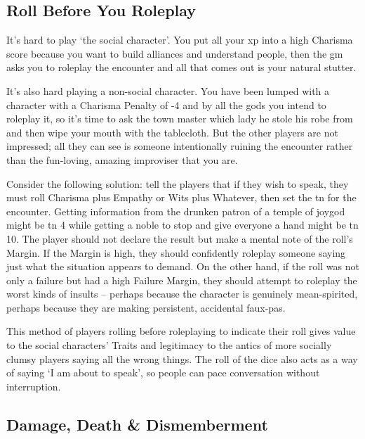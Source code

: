 \begin{multicols}{2}

\subsection{Roll Before You Roleplay}

It's hard to play `the social character'.
You put all your \gls{xp} into a high Charisma score because you want to build alliances and understand people, then the \gls{gm} asks you to roleplay the encounter and all that comes out is your natural stutter.

It's also hard playing a non-social character.
You have been lumped with a character with a Charisma Penalty of -4 and by all the gods you intend to roleplay it, so it's time to ask the town master which lady he stole his robe from and then wipe your mouth with the tablecloth.
But the other players are not impressed; all they can see is someone intentionally ruining the encounter rather than the fun-loving, amazing improviser that you are.

Consider the following solution: tell the players that if they wish to speak, they must roll Charisma plus Empathy or Wits plus Whatever, then set the \gls{tn} for the encounter.
Getting information from the drunken patron of a temple of \gls{joygod} might be \gls{tn} 4 while getting a noble to stop and give everyone a hand might be \gls{tn} 10.
The player should not declare the result but make a mental note of the roll's Margin.
If the Margin is high, they should confidently roleplay someone saying just what the situation appears to demand.
On the other hand, if the roll was not only a failure but had a high Failure Margin, they should attempt to roleplay the worst kinds of insults -- perhaps because the character is genuinely mean-spirited, perhaps because they are making persistent, accidental faux-pas.

This method of players rolling before roleplaying to indicate their roll gives value to the social characters' Traits and legitimacy to the antics of more socially clumsy players saying all the wrong things.
The roll of the dice also acts as a way of saying `I am about to speak', so people can pace conversation without interruption.

\subsection{Damage, Death \& Dismemberment}


\end{multicols}
